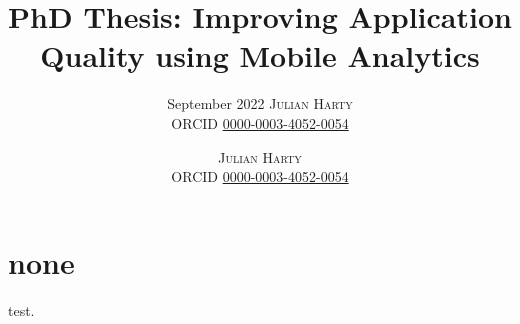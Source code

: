 \documentclass[
	a4paper, %
	fontsize=8pt, %
	twoside=true, %
	numbers=noenddot, %
]{kaobook}
\begin{document}
\subject{PhD Thesis}
\title{PhD Thesis: Improving Application Quality using Mobile Analytics}
\subtitle{ September 2022 \textsc{Julian Harty}\\\small ORCID \href{https://orcid.org/0000-0003-4052-0054}{0000-0003-4052-0054}}
\author{\textsc{Julian Harty}\\\small ORCID \href{https://orcid.org/0000-0003-4052-0054}{0000-0003-4052-0054}}

\maketitle

\section{none}
test.
\end{document}
